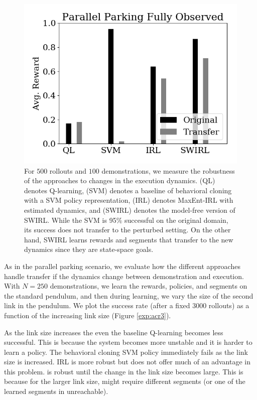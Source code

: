 \begin{figure}[ht!]
\centering
 \includegraphics[width=0.8\columnwidth]{swirl-experiments/pp-fo3.png}
 \caption{For $500$ rollouts and $100$ demonstrations, we measure the robustness of the approaches to changes in the execution dynamics. (QL) denotes Q-learning, (SVM) denotes a baseline of behavioral cloning with a SVM policy representation, (IRL) denotes MaxEnt-IRL with estimated dynamics, and (SWIRL) denotes the model-free version of SWIRL. While the SVM is 95\% successful on the original domain, its success does not transfer to the perturbed setting. On the other hand, SWIRL learns rewards and segments that transfer to the new dynamics since they are state-space goals. \label{exp:pp-fo3}}
\end{figure}


As in the parallel parking scenario, we evaluate how the different approaches handle transfer if the dynamics change between demonstration and execution.
With $N=250$ demonstrations, we learn the rewards, policies, and segments on the standard pendulum, and then during learning, we vary the size of the second link in the pendulum.
We plot the success rate (after a fixed 3000 rollouts) as a function of the increasing link size (Figure \ref{exp:acr3}).

As the link size increases the even the baseline Q-learning becomes less successful. This is because the system becomes more unstable and it is harder to learn a policy.
The behavioral cloning SVM policy immediately fails as the link size is increased.
IRL is more robust but does not offer much of an advantage in this problem.
\hirl is robust until the change in the link size becomes large.
This is because for the larger link size, \hirl might require different segments (or one of the learned segments in unreachable).

